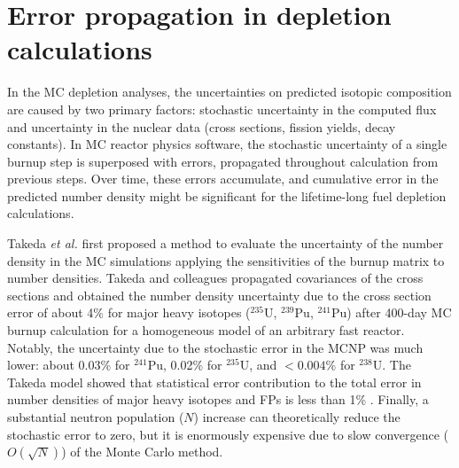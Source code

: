 \chapter{Error propagation in depletion calculations}\label{ch:uq}
In the \gls{MC} depletion analyses, the uncertainties on predicted isotopic 
composition are caused by two primary factors: stochastic uncertainty in 
the computed flux and uncertainty in the nuclear data (cross sections, fission 
yields, decay constants). In \gls{MC} reactor physics software, the stochastic 
uncertainty of a single burnup step is superposed with errors, propagated 
throughout calculation from previous steps. Over time, these errors 
accumulate, and cumulative error in the predicted number density might be 
significant for the lifetime-long fuel depletion calculations.

Takeda \emph{et al.} first proposed a method to evaluate the uncertainty of 
the number density in the \gls{MC} simulations applying the sensitivities of 
the burnup matrix to number densities. Takeda and colleagues propagated 
covariances of the cross sections and obtained the number density uncertainty 
due to the cross section error of about 4\% for major heavy isotopes 
($^{235}$U, $^{239}$Pu, $^{241}$Pu) after 400-day \gls{MC} burnup calculation 
for a homogeneous model of an arbitrary fast reactor. 
Notably, the uncertainty due to the stochastic error in the MCNP 
was much lower: about 0.03\% for $^{241}$Pu, 0.02\% for $^{235}$U, and 
$<0.004$\% for $^{238}$U. The Takeda model showed that statistical error 
contribution to the total error in number densities of major heavy isotopes 
and \glspl{FP} is less than 1\% \cite{takeda_estimation_1999}. Finally, 
a substantial neutron population ($N$) increase can theoretically reduce the 
stochastic error to zero, but it is enormously expensive due to slow 
convergence ($O(\sqrt{N})$) of the Monte Carlo method.

